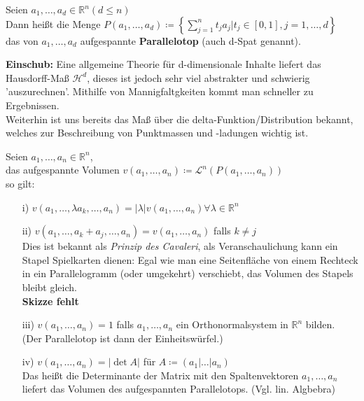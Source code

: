 \begin{definition}[Parallelotop]
    Seien $a_1, \ldots, a_d \in \mathbb{R}^n (d \leq n)$ \\
    Dann heißt die Menge
    $P \left( a_1, \ldots, a_d \right) \coloneqq 
    \left\lbrace 
    \sum\limits_{j=1}^n t_j a_j | t_j \in [0,1], j = 1, \ldots, d    
    \right\rbrace$ \\
    das von $a_1, \ldots, a_d $ aufgespannte \textbf{Parallelotop} (auch d-Spat genannt).
\end{definition}

\textbf{Einschub:} Eine allgemeine Theorie für d-dimensionale Inhalte liefert das
Hausdorff-Maß $\mathcal{H}^d$, dieses ist jedoch sehr viel abstrakter und schwierig 
'auszurechnen'. Mithilfe von Mannigfaltgkeiten kommt man schneller zu Ergebnissen. \\
Weiterhin ist uns bereits das Maß über die delta-Funktion/Distribution bekannt, welches
zur Beschreibung von Punktmassen und -ladungen wichtig ist.

\begin{satz}
    \mbox{}
    Seien $a_1, \ldots, a_n \in \mathbb{R}^n$, \\
    das aufgespannte Volumen 
    $v(a_1, \ldots , a_n) \coloneqq \mathcal{L}^n (P (a_1, \ldots, a_n))$ \\
    so gilt:
    \begin{enumerate}
        \item[i)]
            $v(a_1, \ldots, \lambda a_k, \ldots, a_n) = 
            |\lambda| v(a_1, \ldots, a_n) \forall \lambda \in \mathbb{R}^n $
        \item[ii)]
            $v(a_1, \ldots, a_k + a_j, \ldots, a_n) = v(a_1, \ldots, a_n) $
            falls $k \neq j $ \\
            Dies ist bekannt als \textit{Prinzip des Cavaleri}, als Veranschaulichung kann
            ein Stapel Spielkarten dienen: Egal wie man eine Seitenfläche von einem Rechteck
            in ein Parallelogramm (oder umgekehrt) verschiebt, 
            das Volumen des Stapels bleibt gleich. \\
            \textbf{Skizze fehlt}
        \item[iii)]
            $v(a_1, \ldots, a_n) = 1 $ falls $a_1, \ldots, a_n $ ein Orthonormalsystem
            in $\mathbb{R}^n $ bilden. \\
            (Der Parallelotop ist dann der Einheitswürfel.)
        \item[iv)]
            $v(a_1, \ldots, a_n) = |\det A|$ für $A \coloneqq (a_1 | \ldots | a_n) $ \\
            Das heißt die Determinante der Matrix mit den Spaltenvektoren $a_1, \ldots, a_n$
            liefert das Volumen des aufgespannten Parallelotops. (Vgl. lin. Algbebra)
    \end{enumerate}
\end{satz}

